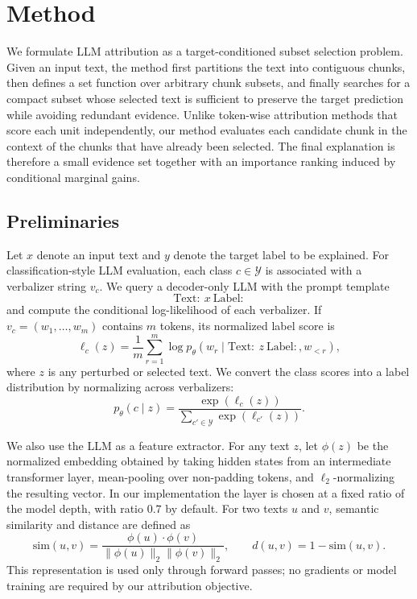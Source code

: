 \section{Method}

We formulate LLM attribution as a target-conditioned subset selection problem.
Given an input text, the method first partitions the text into contiguous chunks,
then defines a set function over arbitrary chunk subsets, and finally searches
for a compact subset whose selected text is sufficient to preserve the target
prediction while avoiding redundant evidence.  Unlike token-wise attribution
methods that score each unit independently, our method evaluates each candidate
chunk in the context of the chunks that have already been selected.  The final
explanation is therefore a small evidence set together with an importance
ranking induced by conditional marginal gains.

\subsection{Preliminaries}

Let $x$ denote an input text and $y$ denote the target label to be explained.
For classification-style LLM evaluation, each class $c \in \mathcal{Y}$ is
associated with a verbalizer string $v_c$.  We query a decoder-only LLM with the
prompt template
\[
    \mathrm{Text:}\ x\ \mathrm{Label:}
\]
and compute the conditional log-likelihood of each verbalizer.  If
$v_c=(w_1,\ldots,w_m)$ contains $m$ tokens, its normalized label score is
\[
    \ell_c(z)=\frac{1}{m}\sum_{r=1}^{m}
    \log p_{\theta}(w_r \mid \mathrm{Text:}\ z\ \mathrm{Label:}, w_{<r}),
\]
where $z$ is any perturbed or selected text.  We convert the class scores into a
label distribution by normalizing across verbalizers:
\[
    p_{\theta}(c \mid z)=
    \frac{\exp(\ell_c(z))}
    {\sum_{c' \in \mathcal{Y}}\exp(\ell_{c'}(z))}.
\]

We also use the LLM as a feature extractor.  For any text $z$, let
$\phi(z)$ be the normalized embedding obtained by taking hidden states from an
intermediate transformer layer, mean-pooling over non-padding tokens, and
$\ell_2$-normalizing the resulting vector.  In our implementation the layer is
chosen at a fixed ratio of the model depth, with ratio $0.7$ by default.  For
two texts $u$ and $v$, semantic similarity and distance are defined as
\[
    \mathrm{sim}(u,v)=
    \frac{\phi(u)\cdot \phi(v)}
    {\|\phi(u)\|_2\|\phi(v)\|_2},
    \qquad
    d(u,v)=1-\mathrm{sim}(u,v).
\]
This representation is used only through forward passes; no gradients or model
training are required by our attribution objective.

